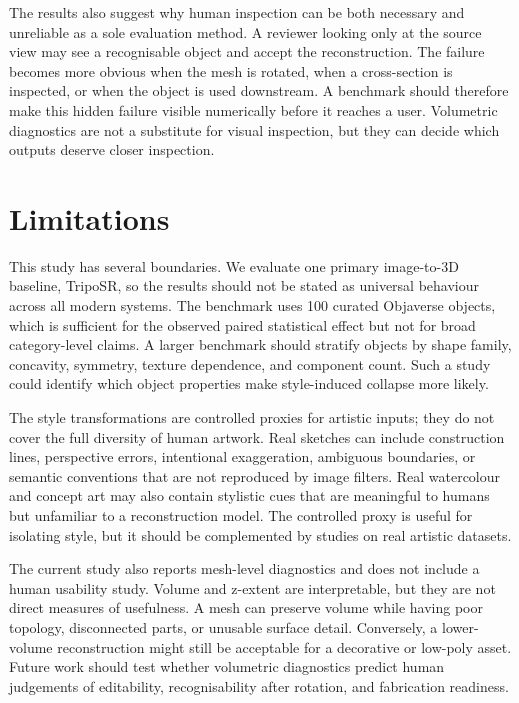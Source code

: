 \documentclass[12pt,a4paper]{article}
\begin{document}
The results also suggest why human inspection can be both necessary and unreliable as a sole evaluation method. A reviewer looking only at the source view may see a recognisable object and accept the reconstruction. The failure becomes more obvious when the mesh is rotated, when a cross-section is inspected, or when the object is used downstream. A benchmark should therefore make this hidden failure visible numerically before it reaches a user. Volumetric diagnostics are not a substitute for visual inspection, but they can decide which outputs deserve closer inspection.

\section{Limitations}

This study has several boundaries. We evaluate one primary image-to-3D baseline, TripoSR, so the results should not be stated as universal behaviour across all modern systems. The benchmark uses 100 curated Objaverse objects, which is sufficient for the observed paired statistical effect but not for broad category-level claims. A larger benchmark should stratify objects by shape family, concavity, symmetry, texture dependence, and component count. Such a study could identify which object properties make style-induced collapse more likely.

The style transformations are controlled proxies for artistic inputs; they do not cover the full diversity of human artwork. Real sketches can include construction lines, perspective errors, intentional exaggeration, ambiguous boundaries, or semantic conventions that are not reproduced by image filters. Real watercolour and concept art may also contain stylistic cues that are meaningful to humans but unfamiliar to a reconstruction model. The controlled proxy is useful for isolating style, but it should be complemented by studies on real artistic datasets.

The current study also reports mesh-level diagnostics and does not include a human usability study. Volume and z-extent are interpretable, but they are not direct measures of usefulness. A mesh can preserve volume while having poor topology, disconnected parts, or unusable surface detail. Conversely, a lower-volume reconstruction might still be acceptable for a decorative or low-poly asset. Future work should test whether volumetric diagnostics predict human judgements of editability, recognisability after rotation, and fabrication readiness.
\end{document}
